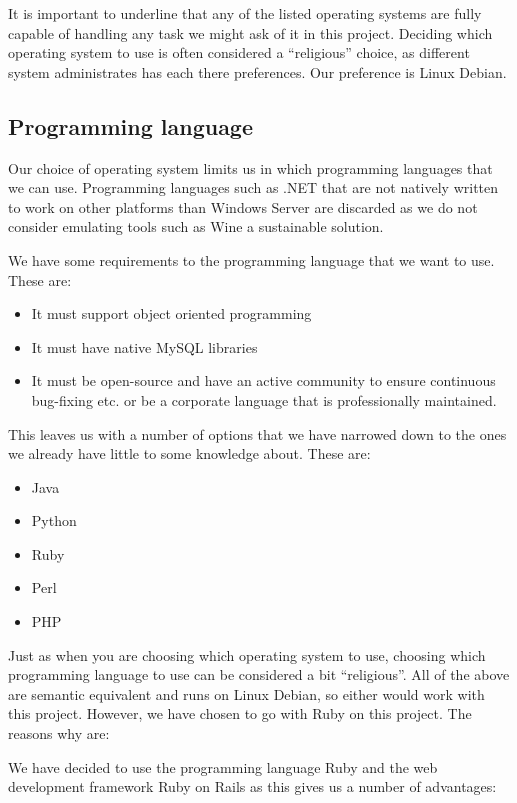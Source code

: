 It is important to underline that any of the listed operating systems are fully capable of handling any task we might ask of it in this project. 
Deciding which operating system to use is often considered a ``religious'' choice, as different system administrates has each there preferences.
Our preference is Linux Debian.

\subsection{Programming language}
Our choice of operating system limits us in which programming languages that we can use. 
Programming languages such as .NET that are not natively written to work on other platforms than Windows Server are discarded as we do not consider emulating tools such as Wine a sustainable solution. 

We have some requirements to the programming language that we want to use.
These are:

\begin{itemize}
	\item It must support object oriented programming
	\item It must have native MySQL libraries
	\item It must be open-source and have an active community to ensure continuous bug-fixing etc. or be a corporate language that is professionally maintained.
\end{itemize} 

This leaves us with a number of options that we have narrowed down to the ones we already have little to some knowledge about. 
These are:
\begin{itemize}
	\item Java
	\item Python
	\item Ruby
	\item Perl
	\item PHP
\end{itemize}

Just as when you are choosing which operating system to use, choosing which programming language to use can be considered a bit ``religious''.
All of the above are semantic equivalent and runs on Linux Debian, so either would work with this project.
However, we have chosen to go with Ruby on this project. 
The reasons why are:

 
We have decided to use the programming language Ruby and the web development framework Ruby on Rails as this gives us a number of advantages:

